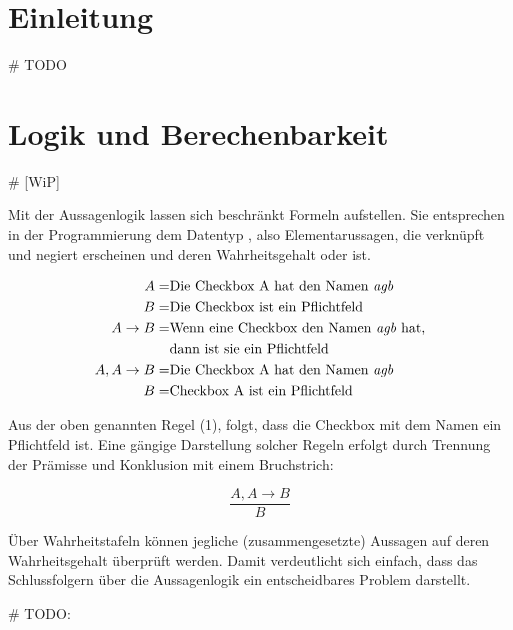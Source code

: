 \documentclass[runningheads,a4paper]{llncs}
\begin{document}
\section{Einleitung}
\# TODO
\newpage
\section{Logik und Berechenbarkeit}

\# [WiP]

Mit der Aussagenlogik lassen sich beschränkt Formeln aufstellen. Sie entsprechen in der Programmierung dem Datentyp , also Elementarussagen, die verknüpft und negiert erscheinen und deren Wahrheitsgehalt  oder  ist.

\begin{align}
\begin{split}
A = & \textnormal{Die Checkbox A hat den Namen \textit{agb}}\\
B = & \textnormal{Die Checkbox ist ein Pflichtfeld}\\
A \to B = & \textnormal{Wenn eine Checkbox den Namen \textit{agb} hat,} \\
& \textnormal{dann ist sie ein Pflichtfeld}\\
A, A \to B = & \textnormal{Die Checkbox A hat den Namen \textit{agb}} \\
B = & \textnormal{Checkbox A ist ein Pflichtfeld}
\end{split}
\end{align}

 

Aus der oben genannten Regel (1), folgt, dass die Checkbox mit dem Namen  ein Pflichtfeld ist.
Eine gängige Darstellung solcher Regeln erfolgt durch Trennung der Prämisse und Konklusion mit einem Bruchstrich:

\begin{equation}
\frac{A, A \to B}{B}
\end{equation}

 
 

Über Wahrheitstafeln können jegliche (zusammengesetzte) Aussagen auf deren Wahrheitsgehalt überprüft werden.
Damit verdeutlicht sich einfach, dass das Schlussfolgern über die Aussagenlogik ein entscheidbares Problem darstellt.

\# TODO:
\end{document}
